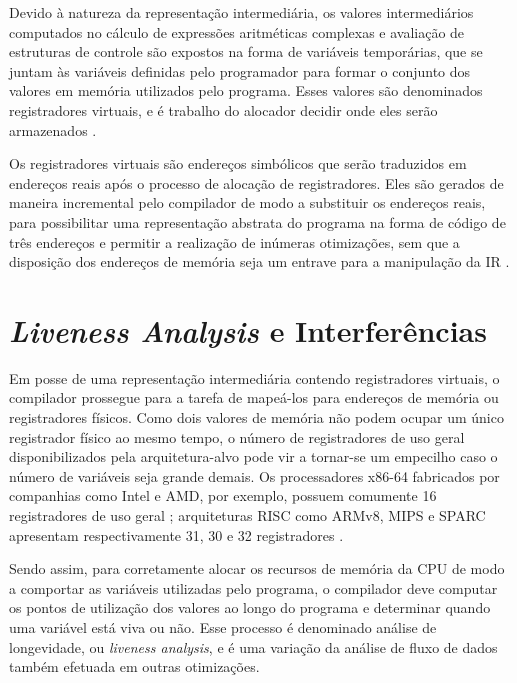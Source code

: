\documentclass[
	12pt,				%
	openright,			%
	oneside,			%
	a4paper,			%
	tccpreliminar,			%
	]{ABNT-DC-UEL}
\begin{document}
Devido à natureza da representação intermediária, os valores intermediários computados no cálculo de expressões aritméticas complexas e avaliação de estruturas de controle são expostos na forma de variáveis temporárias, que se juntam às variáveis definidas pelo programador para formar o conjunto dos valores em memória utilizados pelo programa. Esses valores são denominados registradores virtuais, e é trabalho do alocador decidir onde eles serão armazenados \cite{muchnick:97}.

Os registradores virtuais são endereços simbólicos que serão traduzidos em endereços reais após o processo de alocação de registradores. Eles são gerados de maneira incremental pelo compilador de modo a substituir os endereços reais, para possibilitar uma representação abstrata do programa na forma de código de três endereços e permitir a realização de inúmeras otimizações, sem que a disposição dos endereços de memória seja um entrave para a manipulação da IR \cite{muchnick:97}.

\section{\textit{Liveness Analysis} e Interferências}

Em posse de uma representação intermediária contendo registradores virtuais, o compilador prossegue para a tarefa de mapeá-los para endereços de memória ou registradores físicos. Como dois valores de memória não podem ocupar um único registrador físico ao mesmo tempo, o número de registradores de uso geral disponibilizados pela arquitetura-alvo pode vir a tornar-se um empecilho caso o número de variáveis seja grande demais. Os processadores x86-64 fabricados por companhias como Intel e AMD, por exemplo, possuem comumente 16 registradores de uso geral \cite{amd:06}; arquiteturas RISC como ARMv8, MIPS e SPARC apresentam respectivamente 31, 30 e 32 registradores \cite{elkady:14}.

Sendo assim, para corretamente alocar os recursos de memória da CPU de modo a comportar as variáveis utilizadas pelo programa, o compilador deve computar os pontos de utilização dos valores ao longo do programa e determinar quando uma variável está viva ou não. Esse processo é denominado análise de longevidade, ou \textit{liveness analysis}, e é uma variação da análise de fluxo de dados também efetuada em outras otimizações. 
\end{document}
